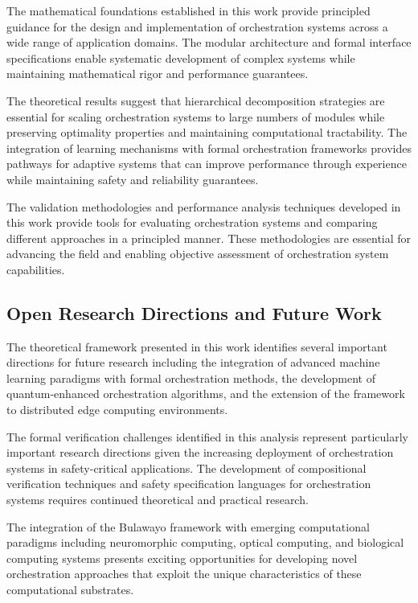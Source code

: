 \documentclass[12pt,a4paper]{article}
\begin{document}
The mathematical foundations established in this work provide principled guidance for the design and implementation of orchestration systems across a wide range of application domains. The modular architecture and formal interface specifications enable systematic development of complex systems while maintaining mathematical rigor and performance guarantees.

The theoretical results suggest that hierarchical decomposition strategies are essential for scaling orchestration systems to large numbers of modules while preserving optimality properties and maintaining computational tractability. The integration of learning mechanisms with formal orchestration frameworks provides pathways for adaptive systems that can improve performance through experience while maintaining safety and reliability guarantees.

The validation methodologies and performance analysis techniques developed in this work provide tools for evaluating orchestration systems and comparing different approaches in a principled manner. These methodologies are essential for advancing the field and enabling objective assessment of orchestration system capabilities.

\subsection{Open Research Directions and Future Work}

The theoretical framework presented in this work identifies several important directions for future research including the integration of advanced machine learning paradigms with formal orchestration methods, the development of quantum-enhanced orchestration algorithms, and the extension of the framework to distributed edge computing environments.

The formal verification challenges identified in this analysis represent particularly important research directions given the increasing deployment of orchestration systems in safety-critical applications. The development of compositional verification techniques and safety specification languages for orchestration systems requires continued theoretical and practical research.

The integration of the Bulawayo framework with emerging computational paradigms including neuromorphic computing, optical computing, and biological computing systems presents exciting opportunities for developing novel orchestration approaches that exploit the unique characteristics of these computational substrates.
\end{document}
